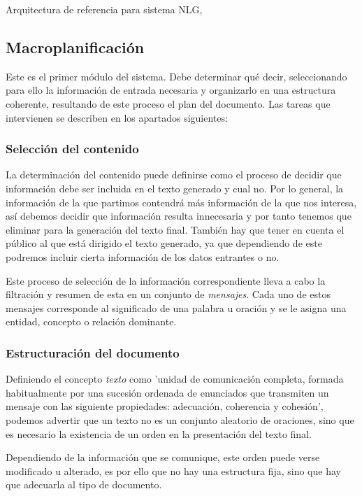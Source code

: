 %
{Arquitectura de referencia para sistema NLG, \citet{vicente2015generacion}}

\subsection{Macroplanificación}
Este es el primer módulo del sistema. Debe determinar qué decir, seleccionando para ello la información de entrada necesaria y organizarlo en una estructura coherente, resultando de este proceso el plan del documento. Las tareas que
intervienen se describen en los apartados siguientes: 

\subsubsection{Selección del contenido}
La determinación del contenido puede definirse como el proceso de decidir que información debe ser incluida en el texto generado y cual no. Por lo general, la información de la que partimos contendrá más información de la que nos interesa, así debemos decidir que información resulta innecesaria y por tanto tenemos que eliminar para la generación del texto final. También hay que tener en cuenta el público al que está dirigido el texto generado, ya que dependiendo de este podremos incluir cierta información de los datos entrantes o no.

Este proceso de selección de la información correspondiente lleva a cabo la filtración y resumen de esta en un conjunto de \textit{mensajes}. Cada uno de estos mensajes corresponde al significado de una palabra u oración y se le asigna una entidad, concepto o relación dominante.

\subsubsection{Estructuración del documento}
Definiendo el concepto \textit{texto} como 'unidad de comunicación completa, formada habitualmente por una sucesión ordenada de enunciados que transmiten un mensaje con las siguiente propiedades: adecuación, coherencia y cohesión', podemos advertir que un texto no es un conjunto aleatorio de oraciones, sino que es necesario la existencia de un orden en la presentación del texto final.

Dependiendo de la información que se comunique, este orden puede verse modificado u alterado, es por ello que no hay una estructura fija, sino que hay que adecuarla al tipo de documento.

